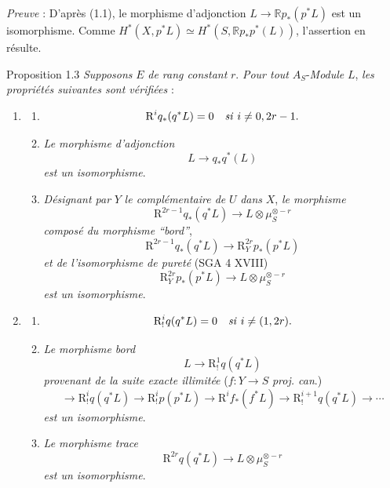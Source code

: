 \emph{Preuve} : D'après (1.1), le morphisme d'adjonction $L\to \mathbb{R} p_*(p^*L)$ est un isomorphisme. Comme $H^*(X,p^*L)\simeq H^*(S,\mathbb{R} p_*p^*(L))$, l'assertion en résulte.

\begin{statement}{Proposition 1.3}
\emph{Supposons} $E$ \emph{de rang constant} $r$. \emph{Pour tout} $A_S$-\emph{Module} $L$, \emph{les propriétés suivantes sont vérifiées} :
\begin{enumerate}[label=(\roman*)]
\item
\begin{enumerate}[label=\alph*)]
\item
\[
\mathrm{R}^i q_*(q^*L)=0\quad\text{\emph{si} }i\ne 0,2r-1.
\]
\item \emph{Le morphisme d'adjonction}
\[
L\longrightarrow q_*q^*(L)
\]
\emph{est un isomorphisme}.
\item \emph{Désignant par} $Y$ \emph{le complémentaire de} $U$
\emph{dans} $X$, \emph{le morphisme}
\[
\mathrm{R}^{2r-1}q_*(q^*L)\longrightarrow L\otimes\mu_S^{\otimes -r}
\]
\emph{composé du morphisme ``bord''},
\[
\mathrm{R}^{2r-1}q_*(q^*L)\longrightarrow \mathrm{R}_Y^{2r}p_*(p^*L)
\tag{1}
\]
\emph{et de l'isomorphisme de pureté} (SGA 4 XVIII)
\[
\mathrm{R}_Y^{2r}p_*(p^*L)\longrightarrow L\otimes\mu_S^{\otimes -r}
\]
\emph{est un isomorphisme}.
\end{enumerate}
\item
\begin{enumerate}[label=\alph*)]
\item
\[
\mathrm{R}_!^i q(q^*L)=0\quad\text{\emph{si} }i\ne (1,2r).
\]
\item \emph{Le morphisme bord}
\[
L\longrightarrow \mathrm{R}_!^1 q(q^*L)
\]
\emph{provenant de la suite exacte illimitée} ($f:Y\to S$ \emph{proj. can}.)
\[
\longrightarrow \mathrm{R}_!^i q(q^*L)\longrightarrow \mathrm{R}_!^i p(p^*L)
\longrightarrow \mathrm{R}^i f_*(f^*L)\longrightarrow \mathrm{R}_!^{i+1}q(q^*L)\longrightarrow\cdots
\]
\emph{est un isomorphisme}.
\item \emph{Le morphisme trace}
\[
\mathrm{R}^{2r}q(q^*L)\longrightarrow L\otimes\mu_S^{\otimes -r}
\]
\emph{est un isomorphisme}.
\end{enumerate}
\end{enumerate}
\end{statement}

